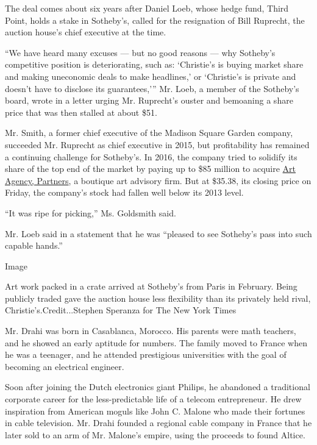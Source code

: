 The deal comes about six years after Daniel Loeb, whose hedge fund,
Third Point, holds a stake in Sotheby's, called for the resignation of
Bill Ruprecht, the auction house's chief executive at the time.

``We have heard many excuses --- but no good reasons --- why Sotheby's
competitive position is deteriorating, such as: `Christie's is buying
market share and making uneconomic deals to make headlines,' or
`Christie's is private and doesn't have to disclose its guarantees,'''
Mr. Loeb, a member of the Sotheby's board, wrote in a letter urging Mr.
Ruprecht's ouster and bemoaning a share price that was then stalled at
about \$51.

Mr. Smith, a former chief executive of the Madison Square Garden
company, succeeded Mr. Ruprecht as chief executive in 2015, but
profitability has remained a continuing challenge for Sotheby's. In
2016, the company tried to solidify its share of the top end of the
market by paying up to \$85 million to acquire
\href{https://www.nytimes3xbfgragh.onion/2016/01/12/arts/sothebys-in-a-gamble-acquires-boutique-art-advisory-firm.html}{Art
Agency, Partners}, a boutique art advisory firm. But at \$35.38, its
closing price on Friday, the company's stock had fallen well below its
2013 level.

``It was ripe for picking,'' Ms. Goldsmith said.

Mr. Loeb said in a statement that he was ``pleased to see Sotheby's pass
into such capable hands.''

Image

Art work packed in a crate arrived at Sotheby's from Paris in February.
Being publicly traded gave the auction house less flexibility than its
privately held rival, Christie's.Credit...Stephen Speranza for The New
York Times

Mr. Drahi was born in Casablanca, Morocco. His parents were math
teachers, and he showed an early aptitude for numbers. The family moved
to France when he was a teenager, and he attended prestigious
universities with the goal of becoming an electrical engineer.

Soon after joining the Dutch electronics giant Philips, he abandoned a
traditional corporate career for the less-predictable life of a telecom
entrepreneur. He drew inspiration from American moguls like John C.
Malone who made their fortunes in cable television. Mr. Drahi founded a
regional cable company in France that he later sold to an arm of Mr.
Malone's empire, using the proceeds to found Altice.

